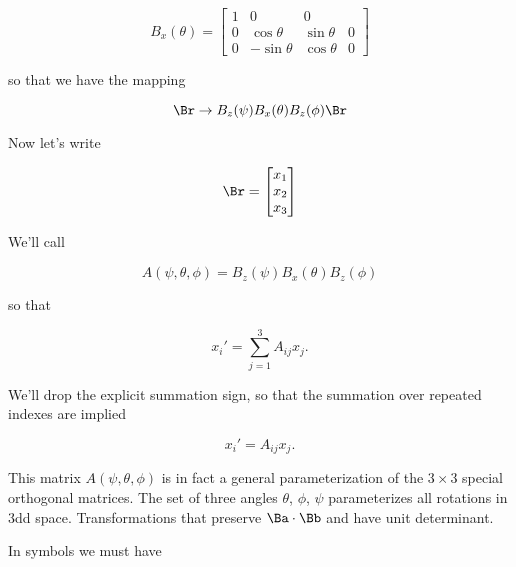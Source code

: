 \begin{equation}\label{eqn:classicalMechanicsEulerAngles:120}
B_x(\theta) =
\begin{bmatrix}
1 & 0 & 0 \\
0 & \cos\theta & \sin\theta & 0 \\
0 & -\sin\theta & \cos\theta & 0 
\end{bmatrix}
\end{equation}

so that we have the mapping

\begin{equation}\label{eqn:classicalMechanicsEulerAngles:140}
\Br \rightarrow B_z(\psi) B_x(\theta) B_z(\phi) \Br
\end{equation}

Now let's write

\begin{equation}\label{eqn:classicalMechanicsEulerAngles:160}
\Br = 
\begin{bmatrix}
x_1 \\
x_2 \\
x_3
\end{bmatrix}
\end{equation}

We'll call

\begin{equation}\label{eqn:classicalMechanicsEulerAngles:180}
A(\psi, \theta, \phi) = B_z(\psi) B_x(\theta) B_z(\phi) 
\end{equation}

so that

\begin{equation}\label{eqn:classicalMechanicsEulerAngles:200}
x_i' = \sum_{j = 1}^3 A_{ij} x_j.
\end{equation}

We'll drop the explicit summation sign, so that the summation over repeated indexes are implied

\begin{equation}\label{eqn:classicalMechanicsEulerAngles:220}
x_i' = A_{ij} x_j.
\end{equation}

This matrix $A(\psi, \theta, \phi)$ is in fact a general parameterization of the $3 \times 3$ special orthogonal matrices. The set of three angles $\theta$, $\phi$, $\psi$ parameterizes all rotations in 3dd space.  Transformations that preserve $\Ba \cdot \Bb$ and have unit determinant.

In symbols we must have

